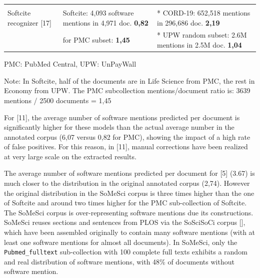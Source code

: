 \documentclass[
]{article}
\begin{document}
\begin{longtable}[]{@{}lll@{}}
\begin{minipage}[t]{0.30\columnwidth}
\strut
\end{minipage} & \begin{minipage}[t]{0.30\columnwidth}\raggedright
\strut
\end{minipage}\tabularnewline
\begin{minipage}[t]{0.30\columnwidth}\raggedright
Softcite recognizer {[}17{]}\strut
\end{minipage} & \begin{minipage}[t]{0.30\columnwidth}\raggedright
Softcite: 4,093 software mentions in 4,971 doc. \textbf{0,82}\strut
\end{minipage} & \begin{minipage}[t]{0.30\columnwidth}\raggedright
* CORD-19: 652,518 mentions in 296,686 doc. \textbf{2,19}\strut
\end{minipage}\tabularnewline
\begin{minipage}[t]{0.30\columnwidth}\raggedright
\strut
\end{minipage} & \begin{minipage}[t]{0.30\columnwidth}\raggedright
for PMC subset: \textbf{1,45}\strut
\end{minipage} & \begin{minipage}[t]{0.30\columnwidth}\raggedright
* UPW random subset: 2.6M mentions in 2.5M doc. \textbf{1,04}\strut
\end{minipage}\tabularnewline
\bottomrule
\end{longtable}

PMC: PubMed Central, UPW: UnPayWall

Note: In Softcite, half of the documents are in Life Science from PMC,
the rest in Economy from UPW. The PMC subcollection mentions/document
ratio is: 3639 mentions / 2500 documents = 1,45

For {[}11{]}, the average number of software mentions predicted per
document is significantly higher for these models than the actual
average number in the annotated corpus (6,07 versus 0,82 for PMC),
showing the impact of a high rate of false positives. For this reason,
in {[}11{]}, manual corrections have been realized at very large scale
on the extracted results.

The average number of software mentions predicted per document for
{[}5{]} (3.67) is much closer to the distribution in the original
annotated corpus (2,74). However the original distribution in the
SoMeSci corpus is three times higher than the one of Softcite and around
two times higher for the PMC sub-collection of Softcite. The SoMeSci
corpus is over-representing software mentions due its constructions.
SoMeSci reuses sections and sentences from PLOS via the SoSciSoCi corpus
{[}{]}, which have been assembled originally to contain many software
mentions (with at least one software mentions for almost all documents).
In SoMeSci, only the \texttt{Pubmed\_fulltext} sub-collection with 100
complete full texts exhibits a random and real distribution of software
mentions, with 48\% of documents without software mention.
\end{document}
